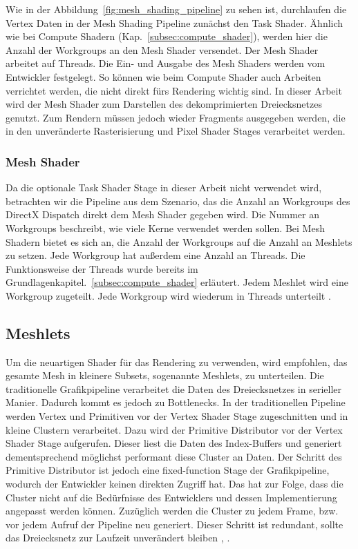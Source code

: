 Wie in der Abbildung~\ref{fig:mesh_shading_pipeline} zu sehen ist, durchlaufen die Vertex Daten in der Mesh Shading Pipeline zunächst den Task Shader.
Ähnlich wie bei Compute Shadern (Kap.~\ref{subsec:compute_shader}), werden hier die Anzahl der Workgroups an den Mesh Shader versendet.
Der Mesh Shader arbeitet auf Threads.
Die Ein- und Ausgabe des Mesh Shaders werden vom Entwickler festgelegt.
So können wie beim Compute Shader auch Arbeiten verrichtet werden, die nicht direkt fürs Rendering wichtig sind.
In dieser Arbeit wird der Mesh Shader zum Darstellen des dekomprimierten Dreiecksnetzes genutzt.
Zum Rendern müssen jedoch wieder Fragments ausgegeben werden, die in den unveränderte Rasterisierung und Pixel Shader Stages verarbeitet werden. \cite{Kubisch2018}

\subsubsection*{Mesh Shader}
Da die optionale Task Shader Stage in dieser Arbeit nicht verwendet wird, betrachten wir die Pipeline aus dem Szenario, das die Anzahl an Workgroups des DirectX Dispatch direkt dem Mesh Shader gegeben wird.
Die Nummer an Workgroups beschreibt, wie viele Kerne verwendet werden sollen.
Bei Mesh Shadern bietet es sich an, die Anzahl der Workgroups auf die Anzahl an Meshlets zu setzen.
Jede Workgroup hat außerdem eine Anzahl an Threads.
Die Funktionsweise der Threads wurde bereits im Grundlagenkapitel.~\ref{subsec:compute_shader} erläutert.
Jedem Meshlet wird eine Workgroup zugeteilt.
Jede Workgroup wird wiederum in Threads unterteilt \cite{Kubisch2018}.

\subsection{Meshlets}
\label{subsec:meshlets}
Um die neuartigen Shader für das Rendering zu verwenden, wird empfohlen, das gesamte Mesh in kleinere Subsets, sogenannte Meshlets, zu unterteilen. 
Die traditionelle Grafikpipeline verarbeitet die Daten des Dreiecksnetzes in serieller Manier. 
Dadurch kommt es jedoch zu Bottlenecks.
In der traditionellen Pipeline werden Vertex und Primitiven vor der Vertex Shader Stage zugeschnitten und in kleine Clustern verarbeitet.
Dazu wird der Primitive Distributor vor der Vertex Shader Stage aufgerufen.
Dieser liest die Daten des Index-Buffers und generiert dementsprechend möglichst performant diese Cluster an Daten.
Der Schritt des Primitive Distributor ist jedoch eine fixed-function Stage der Grafikpipeline, wodurch der Entwickler keinen direkten Zugriff hat.
Das hat zur Folge, dass die Cluster nicht auf die Bedürfnisse des Entwicklers und dessen Implementierung angepasst werden können.
Zuzüglich werden die Cluster zu jedem Frame, bzw. vor jedem Aufruf der Pipeline neu generiert.
Dieser Schritt ist redundant, sollte das Dreiecksnetz zur Laufzeit unverändert bleiben \cite{Carvalho2022}, \cite{Kubisch2018}. \newline

